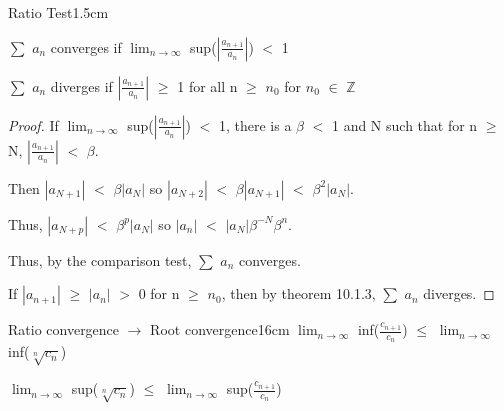     \vspace{0.5cm}



    \begin{ltheorem}{Ratio Test}{1.5cm}
        \item $\sum$ $a_n$ converges if $\lim_{n \rightarrow \infty}$
            sup($|\frac{a_{n+1}}{a_n}|$) $<$ 1
        
        \item $\sum$ $a_n$ diverges if $|\frac{a_{n+1}}{a_n}|$ $\geq$ 1
            for all n $\geq$ $n_0$ for $n_0$ $\in$ $\mathbb{Z}$
    \end{ltheorem}

    \begin{proof}
        If $\lim_{n \rightarrow \infty}$ sup($|\frac{a_{n+1}}{a_n}|$) $<$ 1,
        there is a $\beta$ $<$ 1 and N such that for n $\geq$ N,
        $|\frac{a_{n+1}}{a_n}|$ $<$ $\beta$.

        Then $|a_{N+1}|$ $<$ $\beta |a_N|$ so
        $|a_{N+2}|$ $<$ $\beta$$|a_{N+1}|$ $<$ $\beta^2 |a_N|$.
        
        Thus, $|a_{N+p}|$ $<$ $\beta^p$$|a_N|$ so
        $|a_n|$ $<$ $|a_N| \beta^{-N} \beta^n$.

        Thus, by the {\color{red} comparison test}, $\sum$ $a_n$ converges.

        If $|a_{n+1}|$ $\geq$ $|a_n|$ $>$ 0 for n $\geq$ $n_0$, then by
        {\color{red} theorem 10.1.3}, $\sum$ $a_n$ diverges.
    \end{proof}

    \vspace{0.5cm}



    \begin{wtheorem}{Ratio convergence $\rightarrow$ Root convergence}{16cm}
        $\lim_{n \rightarrow \infty}$ inf($\frac{c_{n+1}}{c_n}$)
        $\leq$ $\lim_{n \rightarrow \infty}$ inf($\sqrt[n]{c_n}$)

        $\lim_{n \rightarrow \infty}$ sup($\sqrt[n]{c_n}$)
        $\leq$ $\lim_{n \rightarrow \infty}$ sup($\frac{c_{n+1}}{c_n}$)        
    \end{wtheorem}

